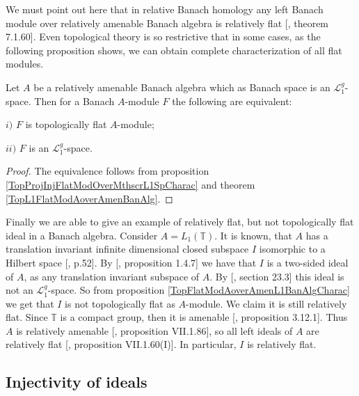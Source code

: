 We must point out here that in relative Banach homology any left Banach module over relatively amenable Banach algebra is relatively flat [\cite{HelBanLocConvAlg}, theorem 7.1.60]. Even topological theory is so restrictive that in some cases, as the following proposition shows, we can obtain complete characterization of all flat modules.

\begin{proposition}\label{TopFlatModAoverAmenL1BanAlgCharac} Let $A$ be a relatively amenable Banach algebra which as Banach space is an $\mathscr{L}_1^g$-space. Then for a Banach $A$-module $F$ the following are equivalent:

$i)$ $F$ is topologically flat $A$-module; 

$ii)$ $F$ is an $\mathscr{L}_1^g$-space.
\end{proposition}
\begin{proof} The equivalence follows from proposition \ref{TopProjInjFlatModOverMthscrL1SpCharac} and theorem \ref{TopL1FlatModAoverAmenBanAlg}.
\end{proof}

Finally we are able to give an example of relatively flat, but not topologically flat ideal in a Banach algebra. Consider $A=L_1(\mathbb{T})$. It is known, that $A$ has a translation invariant infinite dimensional closed subspace $I$ isomorphic to a Hilbert space [\cite{RosProjTransInvSbspLpG}, p.52]. By [\cite{KaniBanAlg}, proposition 1.4.7] we have that $I$ is a two-sided ideal of $A$, as any translation invariant subspace of $A$. By [\cite{DefFloTensNorOpId}, section 23.3] this ideal is not an $\mathscr{L}_1^g$-space. So from proposition \ref{TopFlatModAoverAmenL1BanAlgCharac} we get that $I$ is not topologically flat as $A$-module. We claim it is still relatively flat. Since $\mathbb{T}$ is a compact group, then it is amenable [\cite{PierAmenLCA}, proposition 3.12.1]. Thus $A$ is relatively amenable [\cite{HelBanLocConvAlg}, proposition VII.1.86], so all left ideals of $A$ are relatively flat [\cite{HelBanLocConvAlg}, proposition VII.1.60(I)]. In particular, $I$ is relatively flat.


\subsection{Injectivity of ideals}
\label{SubSectionInjectivityOfIdeals}

